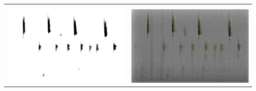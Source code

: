 \begin{center}
\begin{tabular}{cc}
\begin{minipage}{1.5truein}
\end{minipage}\\
\begin{minipage}{1truein}
\includegraphics[height=1truein]{images/Eroded_and_propagated}
\end{minipage}&
\begin{minipage}{1.5truein}
\includegraphics[height=1truein]{images/labeled}
\end{minipage}\\
\end{tabular}
\end{center}

